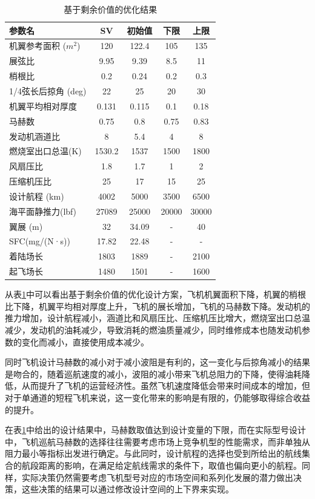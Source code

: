 \documentclass[12pt,a4paper]{report}
\begin{document}
\begin{table}[htp]\centering
\caption{基于剩余价值的优化结果}
\label{tab:optimization-results}
\begin{tabular}{p{3.9cm}|c|c|c|c}
\hline \hline
参数名&	SV&初始值&下限&上限\\\hline
机翼参考面积 ($m^2$)& 120 & 122.4&105 & 135 \\
展弦比&9.95&9.39&8.5&11\\
梢根比&0.2&0.24&0.2&0.3\\
1/4弦长后掠角 (deg)&22&25&20&30\\
机翼平均相对厚度&0.131&0.115&0.1&0.18\\
马赫数&0.75&0.8&0.75&0.83\\
发动机涵道比& 8&5.4& 4&8\\
燃烧室出口总温(K) & 1530.2&1537& 1500& 1800\\
风扇压比 &1.8 &1.7& 1 &2\\
压缩机压比 &25&17& 15&25 \\
设计航程 (km)&4002&5000&3500&6500\\
海平面静推力(lbf)&27089 &25000&20000&30000\\\hline
翼展 (m) &32&34.09&-&40\\
SFC(mg/(N·s))&17.82&22.48&-&-\\
着陆场长&1803&1889&-&2100\\
起飞场长&1480&1501&-&1600\\\hline
\hline
\end{tabular}
\end{table}
从表\ref{tab:optimization-results}中可以看出基于剩余价值的优化设计方案，飞机机翼面积下降，机翼的梢根比下降，机翼平均相对厚度上升，飞机的展长增加，飞机的马赫数下降。发动机的推力增加，设计航程减小，涵道比和风扇压比、压缩机压比增大，燃烧室出口总温减少，发动机的油耗减少，导致消耗的燃油质量减少，同时维修成本也随发动机参数的变化而减小，直接使用成本减少。

同时飞机设计马赫数的减小对于减小波阻是有利的，这一变化与后掠角减小的结果是吻合的，随着巡航速度的减小，波阻的减小带来飞机总阻力的下降，使得油耗降低，从而提升了飞机的运营经济性。虽然飞机速度降低会带来时间成本的增加，但对于单通道的短程飞机来说，这一变化带来的影响是有限的，仍能够取得综合收益的提升。

在表\ref{tab:optimization-results}中给出的设计结果中，马赫数取值达到设计变量的下限，而在实际型号设计中，飞机巡航马赫数的选择往往需要考虑市场上竞争机型的性能需求，而非单独从阻力最小等指标出发进行确定。与此同时，设计航程的选择也受到所给出的航线集合的航段距离的影响，在满足给定航线需求的条件下，取值也偏向更小的航程。同样，实际决策仍然需要考虑飞机型号对应的市场空间和系列化发展的潜力做出决策，这些决策的结果可以通过修改设计空间的上下界来实现。
\end{document}
